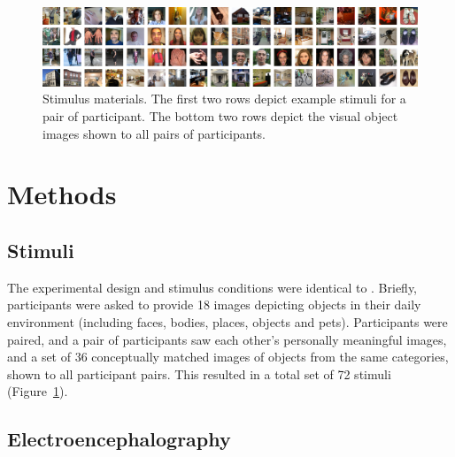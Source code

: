 \documentclass[10pt,letterpaper]{article}
\begin{document}
\begin{figure}[t]
\begin{center}
\includegraphics[width=\linewidth]{figures/figure1.png}
\end{center}
\caption{
  Stimulus materials. The first two rows depict example 
  stimuli for a pair of participant. The bottom two rows depict the 
  visual object images shown to all pairs of participants.
} 
\label{fig1}
\end{figure}

\section{Methods}

\subsection{Stimuli}

The experimental design and stimulus conditions were identical to 
\cite{Charest2014-zn}. Briefly, participants were asked to provide 
18 images depicting objects in their daily environment (including 
faces, bodies, places, objects and pets). Participants were paired, 
and a pair of participants saw each other’s personally meaningful 
images, and a set of 36 conceptually matched images of objects from 
the same categories, shown to all participant pairs. This resulted 
in a total set of 72 stimuli (Figure~\ref{fig1}).


\subsection{Electroencephalography}
\end{document}
